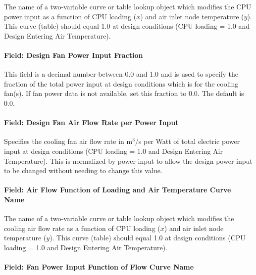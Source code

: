 The name of a two-variable curve or table lookup object which modifies the CPU power input as a function of CPU loading ($x$) and air inlet node temperature ($y$). This curve (table) should equal 1.0 at design conditions (CPU loading = 1.0 and Design Entering Air Temperature).

\paragraph{Field: Design Fan Power Input Fraction}\label{field-design-fan-power-input-fraction-ite-definition}

This field is a decimal number between 0.0 and 1.0 and is used to specify the fraction of the total power input at design conditions which is for the cooling fan(s). If fan power data is not available, set this fraction to 0.0. The default is 0.0.

\paragraph{Field: Design Fan Air Flow Rate per Power Input}\label{field-design-fan-air-flow-rate-per-power-input-ite-definition}

Specifies the cooling fan air flow rate in m$^3$/s per Watt of total electric power input at design conditions (CPU loading = 1.0 and Design Entering Air Temperature). This is normalized by power input to allow the design power input to be changed without needing to change this value.

\paragraph{Field: Air Flow Function of Loading and Air Temperature Curve Name}\label{field-air-flow-function-of-loading-and-air-temperature-curve-name-ite-definition}

The name of a two-variable curve or table lookup object which modifies the cooling air flow rate as a function of CPU loading ($x$) and air inlet node temperature ($y$). This curve (table) should equal 1.0 at design conditions (CPU loading = 1.0 and Design Entering Air Temperature).

\paragraph{Field: Fan Power Input Function of Flow Curve Name}\label{field-fan-power-input-function-of-flow-curve-name-ite-definition}

